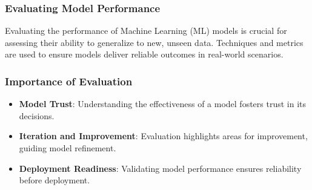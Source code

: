 \documentclass[aspectratio=169]{beamer}
\begin{document}
\begin{frame}
  \frametitle{Evaluating Model Performance}
  Evaluating the performance of Machine Learning (ML) models is crucial for assessing their ability to generalize to new, unseen data. Techniques and metrics are used to ensure models deliver reliable outcomes in real-world scenarios.
\end{frame}

\begin{frame}
  \frametitle{Importance of Evaluation}
  \begin{itemize}
    \item \textbf{Model Trust}: Understanding the effectiveness of a model fosters trust in its decisions.
    \item \textbf{Iteration and Improvement}: Evaluation highlights areas for improvement, guiding model refinement.
    \item \textbf{Deployment Readiness}: Validating model performance ensures reliability before deployment.
  \end{itemize}
\end{frame}
\end{document}
